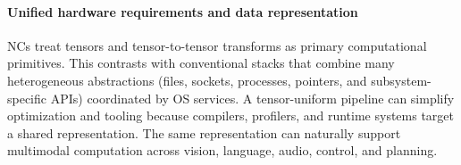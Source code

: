 \paragraph{Unified hardware requirements and data representation}
NCs treat tensors and tensor-to-tensor transforms as primary computational primitives.
This contrasts with conventional stacks that combine many heterogeneous abstractions (files, sockets, processes, pointers, and subsystem-specific APIs) coordinated by OS services.
A tensor-uniform pipeline can simplify optimization and tooling because compilers, profilers, and runtime systems target a shared representation.
The same representation can naturally support multimodal computation across vision, language, audio, control, and planning.

